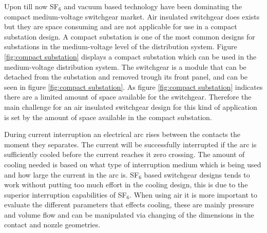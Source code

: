 \documentclass[10pt,a4paper,twoside]{article}
\begin{document}
Upon till now SF$_6$ and vacuum based technology have been dominating the compact medium-voltage switchgear market. Air insulated switchgear does exists but they are space consuming and are not applicable for use in a compact substation design. A compact substation is one of the most common designs for substations in the medium-voltage level of the distribution system. Figure \ref{fig:compact substation} displays a compact substation which can be used in the medium-voltage distribution system. The switchgear is a module that can be detached from the substation and removed trough its front panel, and can be seen in figure \ref{fig:compact substation}. As figure \ref{fig:compact substation} indicates there are a limited amount of space available for the switchgear. Therefore the main challenge for an air insulated switchgear design for this kind of application is set by the amount of space available in the compact substation.

During current interruption an electrical arc rises between the contacts the moment they separates. The current will be successfully interrupted if the arc is sufficiently cooled before the current reaches it zero crossing. The amount of cooling needed is based on what type of interruption medium which is being used and how large the current in the arc is. SF$_6$ based switchgear designs tends to work without putting too much effort in the cooling design, this is due to the superior interruption capabilities of SF$_6$. When using air it is more important to evaluate the different parameters that effects cooling, these are mainly pressure and volume flow and can be manipulated via changing of the dimensions in the contact and nozzle geometries.
\end{document}
